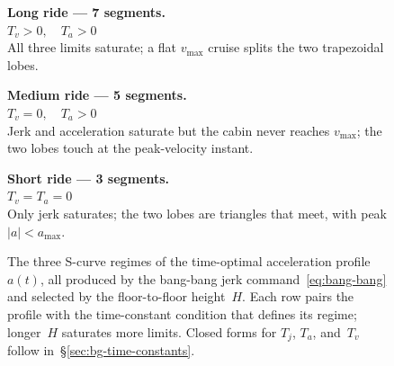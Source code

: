\documentclass[manuscript,review,screen]{acmart}
\begin{document}
\begin{figure}[ht]
\centering
\begin{minipage}[c]{0.36\linewidth}\centering
\end{minipage}\hfill
\begin{minipage}[c]{0.60\linewidth}
  \textbf{Long ride --- 7 segments.}\\
  $T_v>0,\quad T_a>0$\\
  All three limits saturate; a flat $v_{\max}$ cruise splits the
  two trapezoidal lobes.
\end{minipage}

\vspace{1.2em}
\begin{minipage}[c]{0.36\linewidth}\centering
\end{minipage}\hfill
\begin{minipage}[c]{0.60\linewidth}
  \textbf{Medium ride --- 5 segments.}\\
  $T_v=0,\quad T_a>0$\\
  Jerk and acceleration saturate but the cabin never reaches
  $v_{\max}$; the two lobes touch at the peak-velocity instant.
\end{minipage}

\vspace{1.2em}
\begin{minipage}[c]{0.36\linewidth}\centering
\end{minipage}\hfill
\begin{minipage}[c]{0.60\linewidth}
  \textbf{Short ride --- 3 segments.}\\
  $T_v=T_a=0$\\
  Only jerk saturates; the two lobes are triangles that meet, with
  peak $|a|<a_{\max}$.
\end{minipage}

\caption{The three S-curve regimes of the time-optimal acceleration
  profile~$a(t)$, all produced by the bang-bang jerk
  command~\eqref{eq:bang-bang} and selected by the floor-to-floor
  height~$H$.  Each row pairs the profile with the time-constant
  condition that defines its regime; longer~$H$ saturates more
  limits.  Closed forms for $T_j$, $T_a$, and~$T_v$ follow
  in~\S\ref{sec:bg-time-constants}.}
\label{fig:scurve-durations}
\end{figure}
\end{document}
